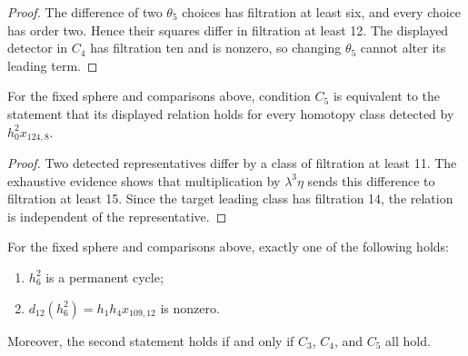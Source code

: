 \begin{proof}
  The difference of two $\theta_5$ choices has filtration at least six, and
  every choice has order two.  Hence their squares differ in filtration at
  least 12.  The displayed detector in $C_4$ has filtration ten and is nonzero,
  so changing $\theta_5$ cannot alter its leading term.
\end{proof}

\begin{lemma}
  \label{lem:near126-equiv-c5}
  \notready
  For the fixed sphere and comparisons above, condition $C_5$ is equivalent to the
  statement that its displayed relation holds for every homotopy class
  detected by $h_0^2x_{124,8}$.
\end{lemma}

\begin{proof}
  Two detected representatives differ by a class of filtration at least 11.
  The exhaustive evidence shows that multiplication by $\lambda^3\eta$ sends
  this difference to filtration at least 15.  Since the target leading class
  has filtration 14, the relation is independent of the representative.
\end{proof}

\begin{proposition}
  \label{prop:possible-h-6-sq}
  \notready
  For the fixed sphere and comparisons above, exactly one of the following holds:
  \begin{enumerate}
    \item $h_6^2$ is a permanent cycle;
    \item $d_{12}(h_6^2)=h_1h_4x_{109,12}$ is nonzero.
  \end{enumerate}
  Moreover, the second statement holds if and only if
  $C_3$, $C_4$, and $C_5$ all hold.
\end{proposition}

